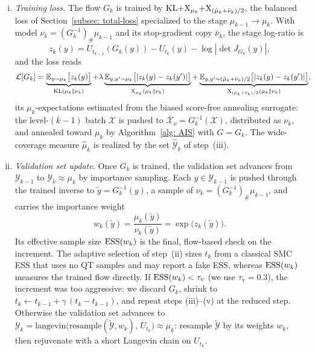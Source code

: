 \documentclass{article}
\begin{document}
\begin{enumerate}[(i)]
\item \emph{Training loss.} The flow $G_k$ is trained by $\mathrm{KL}{+}\mathrm{X}_{\mu_k}{+}\mathrm{X}_{(\hat\mu_k+\bar\nu_k)/2}$, the balanced loss of Section~\ref{subsec: total-loss} specialized to the stage $\mu_{k-1}\to\mu_k$. With model $\nu_k = (G_k^{-1})_{\#}\mu_{k-1}$ and its stop-gradient copy $\bar\nu_k$, the stage log-ratio is
\begin{equation*}
    z_k(y) = U_{t_{k-1}}(G_k(y)) - U_{t_k}(y) - \log|\det J_{G_k}(y)| ,
\end{equation*}
and the loss reads
\begin{align}
    \mathcal{L}[G_k]
    &= \underbrace{\mathbb{E}_{y \sim \mu_k}\bigl[z_k(y)\bigr]}_{\mathrm{KL}(\mu_k\|\nu_k)}
     + \lambda\underbrace{\mathbb{E}_{y, y' \sim \mu_k}\bigl[|z_k(y) - z_k(y')|\bigr]}_{\mathrm{X}_{\mu_k}(\mu_k\|\nu_k)}
     + \underbrace{\mathbb{E}_{y, y' \sim (\hat\mu_k + \bar\nu_k)/2}\bigl[|z_k(y) - z_k(y')|\bigr]}_{\mathrm{X}_{(\hat\mu_k+\bar\nu_k)/2}(\mu_k\|\nu_k)} ,
    \label{eq: stage-loss}
\end{align}
its $\mu_k$-expectations estimated from the biased score-free annealing surrogate: the level-$(k-1)$ batch $\mathcal X$ is pushed to $\bar{\mathcal X}_\nu = G_k^{-1}(\mathcal X)$, distributed as $\nu_k$, and annealed toward $\mu_k$ by Algorithm~\ref{alg: AIS} with $G = G_k$. The wide-coverage measure $\hat\mu_k$ is realized by the set $\hat{\mathcal Y}_k$ of step~(iii).

\item \emph{Validation set update.} Once $G_k$ is trained, the validation set advances from $\mathcal Y_{k-1}$ to $\mathcal Y_k \approx \mu_k$ by importance sampling. Each $y \in \mathcal Y_{k-1}$ is pushed through the trained inverse to $\tilde y = G_k^{-1}(y)$, a sample of $\nu_k = (G_k^{-1})_{\#}\mu_{k-1}$, and carries the importance weight
\begin{equation*}
    w_k(\tilde y) = \frac{\mu_k(\tilde y)}{\nu_k(\tilde y)} = \exp\bigl(z_k(\tilde y)\bigr) .
\end{equation*}
Its effective sample size $\mathrm{ESS}(w_k)$ is the final, flow-based check on the increment. The adaptive selection of step~(ii) sizes $t_k$ from a classical SMC ESS that uses no QT samples and may report a fake ESS, whereas $\mathrm{ESS}(w_k)$ measures the trained flow directly. If $\mathrm{ESS}(w_k) < \tau_{\mathrm v}$ (we use $\tau_{\mathrm v} = 0.3$), the increment was too aggressive: we discard $G_k$, shrink to $t_k \gets t_{k-1} + \gamma\,(t_k - t_{k-1})$, and repeat steps (iii)--(v) at the reduced step. Otherwise the validation set advances to $\mathcal Y_k = \mathrm{langevin}\bigl(\mathrm{resample}(\tilde{\mathcal Y}, w_k),\, U_{t_k}\bigr) \approx \mu_k$: resample $\tilde{\mathcal Y}$ by its weights $w_k$, then rejuvenate with a short Langevin chain on $U_{t_k}$.
\end{enumerate}
\end{document}

